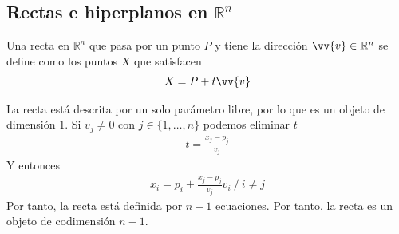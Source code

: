 \documentclass{../Calculo.tex}
\begin{document}
\subsection{Rectas e hiperplanos en $\mathbb{R}^{n}$}
Una recta en $\mathbb{R}^{n}$ que pasa por un punto $P$ y tiene la dirección
$\vv{v} \in \mathbb{R}^{n}$ se define como los puntos $X$ que satisfacen
\begin{equation}
	\begin{split}
		X = P+t\vv{v}
	\end{split}
\end{equation}
\begin{center}
	


\end{center}
La recta está descrita por un solo parámetro libre, por lo que es un objeto de
dimensión $1$. Si $v_{j}\neq 0$ con $j \in \{ 1,\dots ,n \}$  podemos eliminar $t$
\begin{equation}
	\begin{split}
		t = \frac{x_{j}-p_{j}}{v_{j}}
	\end{split}
\end{equation}
Y entonces
\begin{equation}
	\begin{split}
		x_{i} = p_{i} +\frac{x_{j}-p_{j}}{v_{j}}v_{i} ~/~ i \neq j
	\end{split}
\end{equation}
Por tanto, la recta está definida por $n-1$ ecuaciones. Por tanto, la recta
es un objeto de codimensión $n-1$. 
\end{document}
